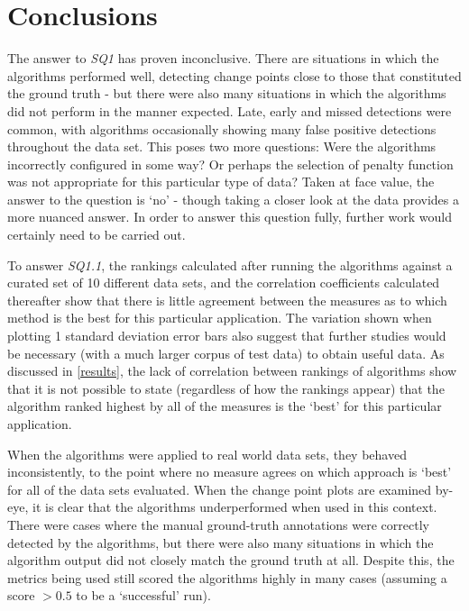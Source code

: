 \documentclass{uvamscse}	%
\begin{document}
\section{Conclusions}

The answer to \emph{SQ1} has proven inconclusive. There are situations in which the algorithms performed well, detecting change points close to those that constituted the ground truth - but there were also many situations in which the algorithms did not perform in the manner expected. Late, early and missed detections were common, with algorithms occasionally showing many false positive detections throughout the data set. This poses two more questions: Were the algorithms incorrectly configured in some way? Or perhaps the selection of penalty function was not appropriate for this particular type of data? Taken at face value, the answer to the question is `no' - though taking a closer look at the data provides a more nuanced answer. In order to answer this question fully, further work would certainly need to be carried out.

To answer \emph{SQ1.1}, the rankings calculated after running the algorithms against a curated set of 10 different data sets, and the correlation coefficients calculated thereafter show that there is little agreement between the measures as to which method is the best for this particular application. The variation shown when plotting 1 standard deviation error bars also suggest that further studies would be necessary (with a much larger corpus of test data) to obtain useful data. As discussed in \autoref{results}, the lack of correlation between rankings of algorithms show that it is not possible to state (regardless of how the rankings appear) that the algorithm ranked highest by all of the measures is the `best' for this particular application.

When the algorithms were applied to real world data sets, they behaved inconsistently, to the point where no measure agrees on which approach is `best' for all of the data sets evaluated. When the change point plots are examined by-eye, it is clear that the algorithms underperformed when used in this context. There were cases where the manual ground-truth annotations were correctly detected by the algorithms, but there were also many situations in which the algorithm output did not closely match the ground truth at all. Despite this, the metrics being used still scored the algorithms highly in many cases (assuming a score $> 0.5$ to be a `successful' run).
\end{document}
